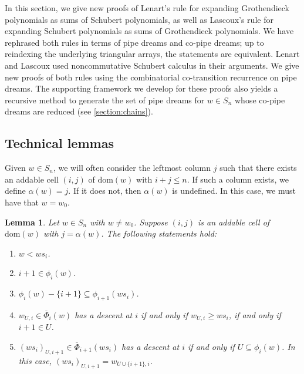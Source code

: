 \documentclass[12 pt]{amsart}
\newcommand{\dom}{\mathrm{dom}}
\newcommand{\addable}{\alpha}
\newtheorem{lemma}[Theorem]{Lemma}
\numberwithin{equation}{section}
\theoremstyle{remark}
\newcommand{\cotransitionindices}{\phi}
\newcommand{\kcotransitionperms}{\overline{\Phi}}
\begin{document}
		In this section, we give new proofs of Lenart's rule \cite{Lenart} for expanding Grothendieck polynomials as sums of Schubert polynomials, as well as Lascoux's rule \cite{Lascoux.03} for expanding Schubert polynomials as sums of Grothendieck polynomials. 
		We have rephrased both rules in terms of pipe dreams and co-pipe dreams; up to reindexing the underlying triangular arrays, the statements are equivalent. 
		Lenart and Lascoux used noncommutative Schubert calculus in their arguments. 
		We give new proofs of both rules using the combinatorial co-transition recurrence on pipe dreams. 
		The supporting framework we develop for these proofs also yields a recursive method to generate the set of pipe dreams for $w\in S_n$ whose co-pipe dreams are reduced (see \cref{section:chains}).
		
		\subsection{Technical lemmas}
		
		
		Given $w \in S_n$, we will often consider the leftmost column $j$ such that there exists an addable cell $(i,j)$ of $\dom(w)$ with $i + j \leq n$. If such a column exists, we define $\addable(w) = j$. If it does not, then $\addable(w)$ is undefined. In this case, we must have that $w = w_0$.
		
		
		\begin{lemma} 
			\label{lemma:kcotransitiondescents}
			Let $w \in S_{n} $ with $w \neq w_0$. Suppose $(i,j)$ is an addable cell of $\dom(w)$ with $j = \addable(w)$.
			The following statements hold:
			\begin{enumerate}
				\item $w < ws_i$.
				\item $i + 1 \in \cotransitionindices_i(w)$.
				\item $\cotransitionindices_i(w)-\{i + 1\} \subseteq \cotransitionindices_{i + 1}(ws_i)$.
				\item $w_{U,i} \in \kcotransitionperms_i(w)$ has a descent at $i$ if and only if $w_{U,i}\geq ws_i$, if and only if $i + 1 \in U$.
				\item $(ws_i)_{U,i+1} \in \kcotransitionperms_{i + 1}(ws_i)$ has a descent at $i$ if and only if $U \subseteq \cotransitionindices_i(w)$. 
				In this case, $(ws_i)_{U,i + 1}=w_{U \cup \{i + 1\},i}$.
			\end{enumerate}
		\end{lemma}
		
\end{document}
